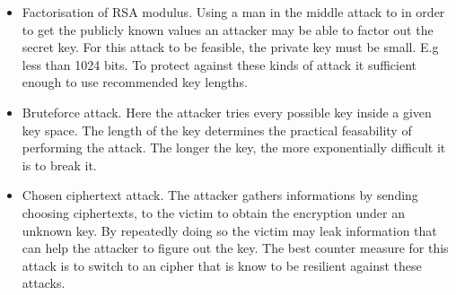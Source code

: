 \begin {itemize}

\item Factorisation of RSA modulus. Using a man in the middle attack to in order to get the publicly known values an attacker may be able to factor out the secret key. For this attack to be feasible, the private key must be small. E.g less than 1024 bits. To protect against these kinds of attack it sufficient enough to use recommended key lengths. \cite {nisc}  

\item Bruteforce attack. Here the attacker tries every possible key inside a given key space. The length of the key determines the practical feasability of performing the attack. The longer the key, the more exponentially difficult it is to break it. 

\item Chosen ciphertext attack. The attacker gathers informations by sending choosing ciphertexts, to the victim to obtain the encryption under an unknown key. By repeatedly doing so the victim may leak information that can help the attacker to figure out the key. The best counter measure for this attack is to switch to an cipher that is know to be resilient against these attacks. 
\end {itemize}


